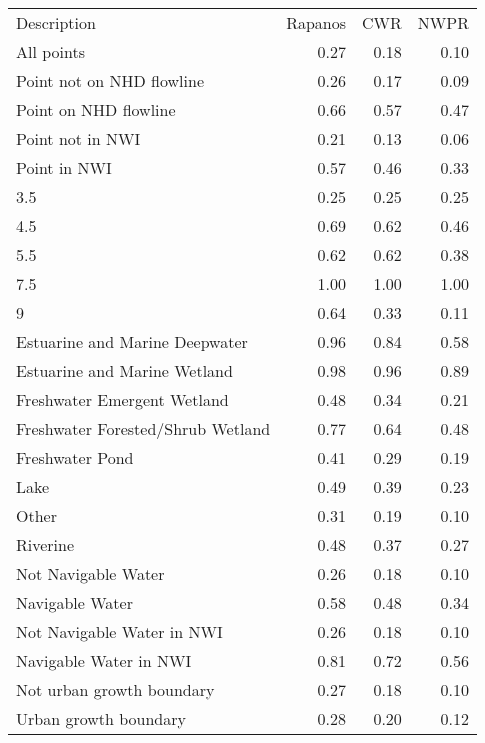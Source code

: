 \begin{tabular}{lrrr}
Description & Rapanos & CWR & NWPR \\
All points & 0.27 & 0.18 & 0.10 \\
Point not on NHD flowline & 0.26 & 0.17 & 0.09 \\
Point on NHD flowline & 0.66 & 0.57 & 0.47 \\
Point not in NWI & 0.21 & 0.13 & 0.06 \\
Point in NWI & 0.57 & 0.46 & 0.33 \\
3.5 & 0.25 & 0.25 & 0.25 \\
4.5 & 0.69 & 0.62 & 0.46 \\
5.5 & 0.62 & 0.62 & 0.38 \\
7.5 & 1.00 & 1.00 & 1.00 \\
9 & 0.64 & 0.33 & 0.11 \\
Estuarine and Marine Deepwater & 0.96 & 0.84 & 0.58 \\
Estuarine and Marine Wetland & 0.98 & 0.96 & 0.89 \\
Freshwater Emergent Wetland & 0.48 & 0.34 & 0.21 \\
Freshwater Forested/Shrub Wetland & 0.77 & 0.64 & 0.48 \\
Freshwater Pond & 0.41 & 0.29 & 0.19 \\
Lake & 0.49 & 0.39 & 0.23 \\
Other & 0.31 & 0.19 & 0.10 \\
Riverine & 0.48 & 0.37 & 0.27 \\
Not Navigable Water & 0.26 & 0.18 & 0.10 \\
Navigable Water & 0.58 & 0.48 & 0.34 \\
Not Navigable Water in NWI & 0.26 & 0.18 & 0.10 \\
Navigable Water in NWI & 0.81 & 0.72 & 0.56 \\
Not urban growth boundary & 0.27 & 0.18 & 0.10 \\
Urban growth boundary & 0.28 & 0.20 & 0.12 \\
\end{tabular}
